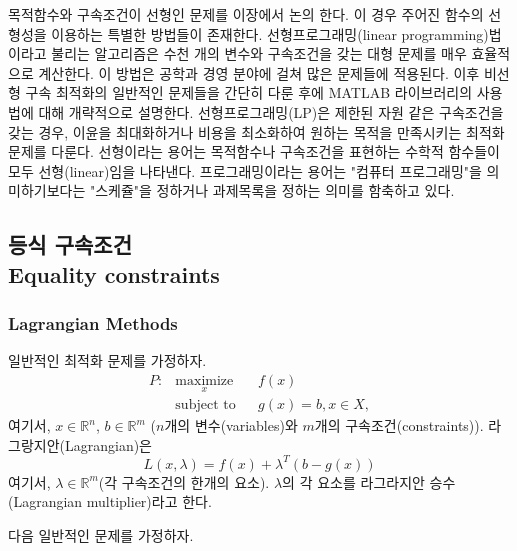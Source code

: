 목적함수와 구속조건이 선형인 문제를 이장에서 논의 한다. 이 경우 주어진 함수의 선형성을 이용하는 특별한 방법들이 존재한다. 선형프로그래밍(linear programming)법이라고 불리는 알고리즘은 수천 개의 변수와 구속조건을 갖는 대형 문제를 매우 효율적으로 계산한다. 이 방법은 공학과 경영 분야에 걸쳐 많은 문제들에 적용된다. 이후 비선형 구속 최적화의 일반적인 문제들을 간단히 다룬 후에 MATLAB 라이브러리의 사용법에 대해 개략적으로 설명한다.
선형프로그래밍(LP)은 제한된 자원 같은 구속조건을 갖는 경우, 이윤을 최대화하거나 비용을 최소화하여 원하는 목적을 만족시키는 최적화 문제를 다룬다. 선형이라는 용어는 목적함수나 구속조건을 표현하는 수학적 함수들이 모두 선형(linear)임을 나타낸다. 프로그래밍이라는 용어는 "컴퓨터 프로그래밍"을 의미하기보다는 "스케쥴"을 정하거나 과제목록을 정하는 의미를 함축하고 있다.
\subsection{등식 구속조건\\Equality constraints}
\subsubsection{Lagrangian Methods}
일반적인 최적화 문제를 가정하자.
\begin{equation*}
\begin{aligned}
P : & \underset{x}{\text{maximize}}
& & f(x)\\
& \text{subject to}
& & g(x)=b, x\in X,
\end{aligned}
\end{equation*}
여기서, $x\in\mathbb{R}^n$, $b\in\mathbb{R}^m$ ($n$개의 변수(variables)와 $m$개의 구속조건(constraints)). 라그랑지안(Lagrangian)은
\begin{equation}
L(x,\lambda)=f(x)+\lambda^{T}(b-g(x))
\end{equation}
여기서, $\lambda\in\mathbb{R}^{m}$(각 구속조건의 한개의 요소). $\lambda$의 각 요소를 라그라지안 승수(Lagrangian multiplier)라고 한다.

다음 일반적인 문제를 가정하자.

